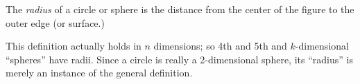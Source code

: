 \documentclass{article}
\begin{document}
The \emph{radius} of a circle or sphere is the distance from the center of the figure to the outer edge (or surface.)  

This definition actually holds in $n$ dimensions; so 4th and 5th and $k$-dimensional ``spheres'' have radii.  Since a circle is really a 2-dimensional sphere, its ``radius'' is merely an instance of the general definition.
\end{document}

